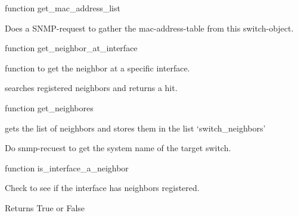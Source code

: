\documentclass[letterpaper,10pt,english]{sphinxmanual}
\begin{document}
\begin{fulllineitems}

\begin{fulllineitems}
\label{Switch_Object:Switch_Object.Sw_Object.get_mac_address_list}
function get\_mac\_address\_list

Does a SNMP-request to gather the mac-address-table from this switch-object.

\end{fulllineitems}


\begin{fulllineitems}
\label{Switch_Object:Switch_Object.Sw_Object.get_neighbor_at_interface}
function get\_neighbor\_at\_interface

function to get the neighbor at a specific interface.

searches registered neighbors and returns a hit.

\end{fulllineitems}


\begin{fulllineitems}
\label{Switch_Object:Switch_Object.Sw_Object.get_neighbors}
function get\_neighbores

gets the list of neighbors and stores them in the list `switch\_neighbors'

\end{fulllineitems}


\begin{fulllineitems}
\label{Switch_Object:Switch_Object.Sw_Object.get_switch_data}
Do snmp-recuest to get the system name of the target switch.

\end{fulllineitems}


\begin{fulllineitems}
\label{Switch_Object:Switch_Object.Sw_Object.is_interface_a_neighbor}
function is\_interface\_a\_neighbor

Check to see if the interface has neighbors registered.

Returns True or False

\end{fulllineitems}


\end{fulllineitems}
\end{document}
